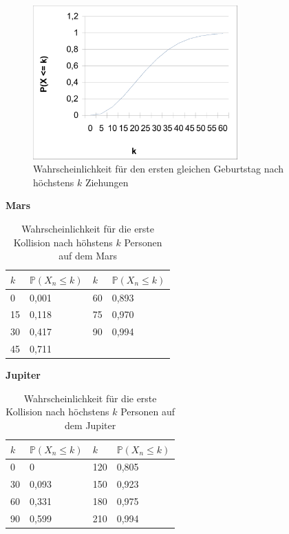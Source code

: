 \documentclass[../main.tex]{subfiles}
\begin{document}
\begin{figure}[h]
 \begin{center}
 \includegraphics[width=0.7\textwidth]{../graphics/perde.png}
\end{center}
\caption{\label{num.fpe} Wahrscheinlichkeit für den ersten gleichen Geburtstag nach höchstens $k$ Ziehungen}
\end{figure}


\textbf{Mars}

\begin{table}[h]
\centering
\begin{tabular}{|l|l|l|l|}
\hline
$k$  & $\mathbb{P}(X_{n} \leq k)$ & $k$  & $\mathbb{P}(X_{n} \leq k)$ \\ \hline
0  & 0,001            & 60 & 0,893            \\
15 & 0,118            & 75 & 0,970            \\
30 & 0,417            & 90 & 0,994            \\
45 & 0,711            &    &                  \\ \hline
\end{tabular}
\caption{\label{num.tpm} Wahrscheinlichkeit für die erste Kollision nach höhstens $k$ Personen auf dem Mars}
\end{table}

\textbf{Jupiter}

\begin{table}[h]
\centering
\begin{tabular}{|l|l|l|l|}
\hline
$k$  & $\mathbb{P}(X_{n} \leq k)$ & $k$   & $\mathbb{P}(X_{n} \leq k)$\\ \hline
0  & 0                & 120 & 0,805            \\
30 & 0,093            & 150 & 0,923            \\
60 & 0,331            & 180 & 0,975            \\
90 & 0,599            & 210 & 0,994            \\ \hline
\end{tabular}
\caption{\label{num.tpj} Wahrscheinlichkeit für die erste Kollision nach höchstens $k$ Personen auf dem Jupiter}
\end{table}
\end{document}

